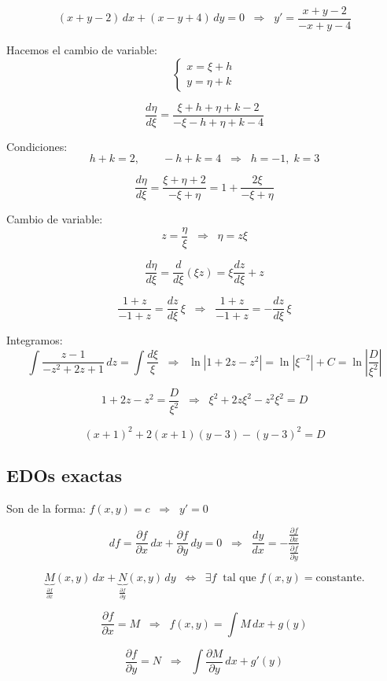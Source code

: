 \documentclass[a4paper,12pt]{article}
\begin{document}
\[
(x+y-2)\,dx + (x-y+4)\,dy = 0
\;\;\Rightarrow\;\;
y' = \frac{x+y-2}{-x+y-4}
\]

Hacemos el cambio de variable:
\[
\begin{cases}
x = \xi + h \\
y = \eta + k
\end{cases}
\]

\[
\frac{d\eta}{d\xi} = \frac{\xi + h + \eta + k - 2}{-\xi - h + \eta + k - 4}
\]

Condiciones:
\[
h+k=2, 
\qquad 
-h+k=4
\;\;\Rightarrow\;\;
h=-1, \; k=3
\]

\[
\frac{d\eta}{d\xi} = \frac{\xi + \eta + 2}{-\xi + \eta}
= 1 + \frac{2\xi}{-\xi + \eta}
\]

Cambio de variable:
\[
z = \frac{\eta}{\xi} \;\;\Rightarrow\;\; \eta = z\xi
\]

\[
\frac{d\eta}{d\xi} = \frac{d}{d\xi}(\xi z) = \xi \frac{dz}{d\xi} + z
\]

\[
\frac{1+z}{-1+z} = \frac{dz}{d\xi}\,\xi
\;\;\Rightarrow\;\;
\frac{1+z}{-1+z} = -\frac{dz}{d\xi}\,\xi
\]

Integramos:
\[
\int \frac{z-1}{-z^2+2z+1}\,dz = \int \frac{d\xi}{\xi}
\;\;\Rightarrow\;\;
\ln|1+2z-z^2| = \ln|\xi^{-2}| + C = \ln\left|\frac{D}{\xi^2}\right|
\]

\[
1+2z-z^2 = \frac{D}{\xi^2}
\;\;\Rightarrow\;\;
\xi^2 + 2z\xi^2 - z^2\xi^2 = D
\]

\[
(x+1)^2 + 2(x+1)(y-3) - (y-3)^2 = D
\]

\subsection{EDOs exactas}

Son de la forma: $f(x,y)=c \;\;\Rightarrow\;\; y'=0$

\[
df = \frac{\partial f}{\partial x}\,dx + \frac{\partial f}{\partial y}\,dy = 0
\;\;\Rightarrow\;\;
\frac{dy}{dx} = -\frac{\frac{\partial f}{\partial x}}{\frac{\partial f}{\partial y}}
\]

\[
\underbrace{M}_{\frac{\partial f}{\partial x}}(x,y)\,dx + 
\underbrace{N}_{\frac{\partial f}{\partial y}}(x,y)\,dy
\;\;\Leftrightarrow\;\; 
\exists f \;\; \text{tal que } f(x,y)=\text{constante}.
\]

\[
\frac{\partial f}{\partial x}=M \;\;\Rightarrow\;\; 
f(x,y) = \int M\,dx + g(y)
\]

\[
\frac{\partial f}{\partial y}=N \;\;\Rightarrow\;\;
\int \frac{\partial M}{\partial y}\,dx + g'(y)
\]
\end{document}
